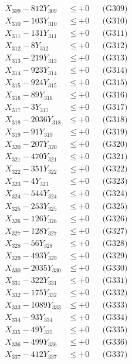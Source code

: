 \documentclass[a4paper,10pt]{article}
\begin{document}
{\begin{align}
X_{309} - 812Y_{309} &\leq +0 && \text{(G309)} \\
X_{310} - 103Y_{310} &\leq +0 && \text{(G310)} \\
\allowbreak
X_{311} - 131Y_{311} &\leq +0 && \text{(G311)} \\
X_{312} - 8Y_{312} &\leq +0 && \text{(G312)} \\
X_{313} - 219Y_{313} &\leq +0 && \text{(G313)} \\
X_{314} - 923Y_{314} &\leq +0 && \text{(G314)} \\
X_{315} - 924Y_{315} &\leq +0 && \text{(G315)} \\
X_{316} - 89Y_{316} &\leq +0 && \text{(G316)} \\
X_{317} - 3Y_{317} &\leq +0 && \text{(G317)} \\
X_{318} - 2036Y_{318} &\leq +0 && \text{(G318)} \\
X_{319} - 91Y_{319} &\leq +0 && \text{(G319)} \\
X_{320} - 207Y_{320} &\leq +0 && \text{(G320)} \\
\allowbreak
X_{321} - 470Y_{321} &\leq +0 && \text{(G321)} \\
X_{322} - 351Y_{322} &\leq +0 && \text{(G322)} \\
X_{323} - 4Y_{323} &\leq +0 && \text{(G323)} \\
X_{324} - 544Y_{324} &\leq +0 && \text{(G324)} \\
X_{325} - 253Y_{325} &\leq +0 && \text{(G325)} \\
X_{326} - 126Y_{326} &\leq +0 && \text{(G326)} \\
X_{327} - 128Y_{327} &\leq +0 && \text{(G327)} \\
X_{328} - 56Y_{328} &\leq +0 && \text{(G328)} \\
X_{329} - 493Y_{329} &\leq +0 && \text{(G329)} \\
X_{330} - 2035Y_{330} &\leq +0 && \text{(G330)} \\
\allowbreak
X_{331} - 322Y_{331} &\leq +0 && \text{(G331)} \\
X_{332} - 175Y_{332} &\leq +0 && \text{(G332)} \\
X_{333} - 1089Y_{333} &\leq +0 && \text{(G333)} \\
X_{334} - 93Y_{334} &\leq +0 && \text{(G334)} \\
X_{335} - 49Y_{335} &\leq +0 && \text{(G335)} \\
X_{336} - 499Y_{336} &\leq +0 && \text{(G336)} \\
X_{337} - 412Y_{337} &\leq +0 && \text{(G337)} \\

\end{align}}
\end{document}
